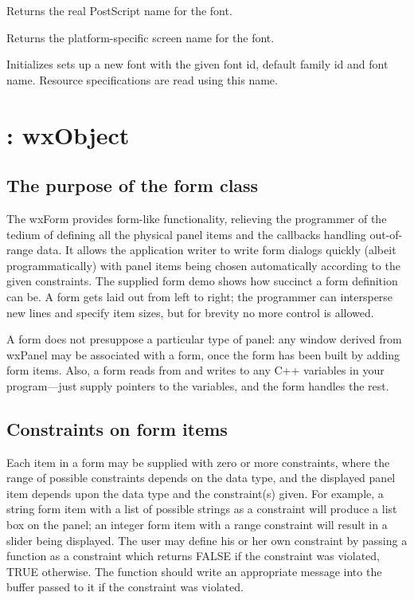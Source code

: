 Returns the real PostScript name for the font.



Returns the platform-specific screen name for the font.




Initializes sets up a new font with the given font id, default family id
and font name. Resource specifications are read using this name.




\section{: wxObject}\label{wxform}

\subsection{The purpose of the form class}

The wxForm provides form-like functionality, relieving the
programmer of the tedium of defining all the physical panel items and
the callbacks handling out-of-range data. It allows the application
writer to write form dialogs quickly (albeit programmatically) with
panel items being chosen automatically according to the given
constraints. The supplied form demo shows how succinct a form
definition can be. A form gets laid out from left to right; the
programmer can intersperse new lines and specify item sizes, but for
brevity no more control is allowed.

A form does not presuppose a particular type of panel: any window
derived from wxPanel may be associated with a form, once the form has
been built by adding form items. Also, a form reads from and writes to
any C++ variables in your program---just supply pointers to the variables,
and the form handles the rest.

\subsection{Constraints on form items}

Each item in a form may be supplied with zero or more constraints, where
the range of possible constraints depends on the data type, and the
displayed panel item depends upon the data type and the constraint(s)
given.  For example, a string form item with a list of possible strings
as a constraint will produce a list box on the panel; an integer form
item with a range constraint will result in a slider being displayed.
The user may define his or her own constraint by passing a function as a
constraint which returns FALSE if the constraint was violated, TRUE
otherwise.  The function should write an appropriate message into the
buffer passed to it if the constraint was violated.

